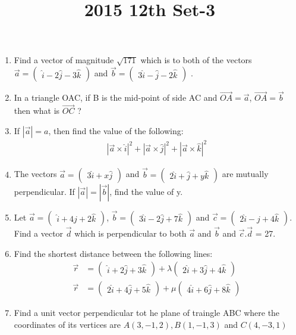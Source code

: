 \documentclass[12pt,-letter paper]{article}
\title{2015 12th Set-3}
\newcommand{\myvec}[1]{\ensuremath{\begin{pmatrix}#1\end{pmatrix}}}
\providecommand{\abs}[1]{\left\vert#1\right\vert}
\begin{document}

\begin{enumerate}

\section{Vectors}
	\item Find a vector of magnitude $\sqrt{171}$ which is  to both of the vectors $\overrightarrow{a} = \myvec{\hat{i}-2\hat{j}-3\hat{k}}$ and $\overrightarrow{b} = \myvec{3\hat{i}-\hat{j}-2\hat{k}}$ .
	\item In a triangle OAC, if B is the mid-point of side AC and
    $\overrightarrow{OA} = \overrightarrow{a}$, $\overrightarrow{OA} = \overrightarrow{b}$ then what is $\overrightarrow{OC}$ ?
    \item If $\abs{\overrightarrow{a}} = a$, then find the value of the following:
    \begin{align*}
       {\abs{\overrightarrow{a}\times\hat{i}}}^2+{\abs{\overrightarrow{a}\times\hat{j}}}^2+{\abs{\overrightarrow{a}\times\hat{k}}}^2
    \end{align*}
    \item The vectors $\overrightarrow{a} = \myvec{3\hat{i}+x\hat{j}}$ and $\overrightarrow{b} = \myvec{2\hat{i}+\hat{j}+y\hat{k}}$ are mutually perpendicular. If  $\abs{\overrightarrow{a}} = \abs{\overrightarrow{b}}$, find the value of y.
    \item Let $\overrightarrow{a} = \myvec{\hat{i}+4\hat{j}+2\hat{k}}$, $\overrightarrow{b} = \myvec{3\hat{i}-2\hat{j}+7\hat{k}}$ and $\overrightarrow{c} = \myvec{2\hat{i}-\hat{j}+4\hat{k}}$. Find a vector $\overrightarrow{d}$ which is perpendicular to both $\overrightarrow{a}$ and $\overrightarrow{b}$ and $\overrightarrow{c}.\overrightarrow{d}$ = 27.
    \item Find the shortest distance between the following lines:
    \begin{align*}
        \overrightarrow{r} &= \myvec{\hat{i}+2\hat{j}+3\hat{k}} + \lambda\myvec{2\hat{i}+3\hat{j}+4\hat{k}}\\
        \overrightarrow{r} &= \myvec{2\hat{i}+4\hat{j}+5\hat{k}} + \mu\myvec{4\hat{i}+6\hat{j}+8\hat{k}}
    \end{align*}
    \item Find a unit vector perpendicular tot he plane of traingle ABC where the coordinates of its vertices are $A(3,-1,2), B(1,-1,3)$ and $C(4,-3,1)$

\end{enumerate}
\end{document}
